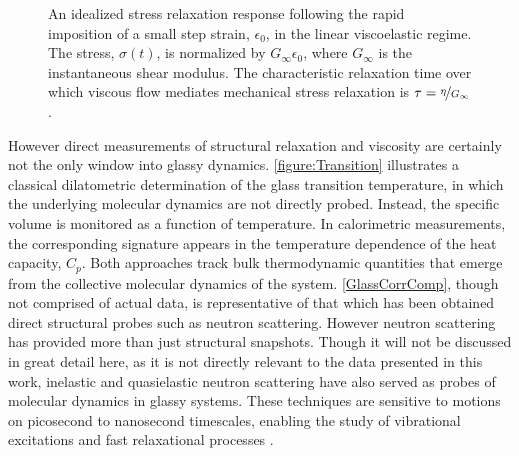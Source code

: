 \begin{figure}[!htbp]
	\centering
	
	
	\caption{An idealized stress relaxation response following the rapid imposition of a small step strain, $\epsilon_0$, in the linear viscoelastic regime. The stress, $\sigma\!\left(t\right)$, is normalized by $G_\infty\epsilon_0$, where $G_\infty$ is the instantaneous shear modulus. The characteristic relaxation time over which viscous flow mediates mechanical stress relaxation is $\tau=\nicefrac{\eta}{G_\infty}$.}  
	\label{figure:MaxwellRelaxation}
\end{figure}


However direct measurements of structural relaxation and viscosity are certainly not the only window into glassy dynamics. \fig \nolinebreak \ref{figure:Transition} illustrates a classical dilatometric determination of the glass transition temperature, in which the underlying molecular dynamics are not directly probed. Instead, the specific volume is monitored as a function of temperature. In calorimetric measurements, the corresponding signature appears in the temperature dependence of the heat capacity, $C_p$. Both approaches track bulk thermodynamic quantities that emerge from the collective molecular dynamics of the system.  \fig \nolinebreak \ref{GlassCorrComp}, though not comprised of actual data, is representative of that which has been obtained \via direct structural probes such as neutron scattering.  However neutron scattering has provided more than just structural snapshots.  Though it will not be discussed in great detail here, as it is not directly relevant to the data presented in this work, inelastic and quasielastic neutron scattering have also served as probes of molecular dynamics in glassy systems. These techniques are sensitive to motions on picosecond to nanosecond timescales, enabling the study of vibrational excitations and fast relaxational processes \nolinebreak \cite{SinclairRN, Tolle, Jurkiewicz}.

